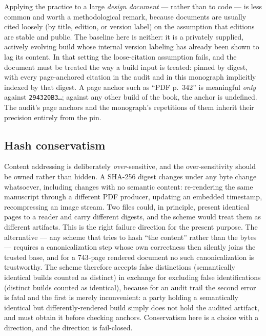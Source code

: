 Applying the practice to a large \emph{design document} --- rather than
to code --- is less common and worth a methodological remark, because
documents are usually cited loosely (by title, edition, or version
label) on the assumption that editions are stable and public. The
baseline here is neither: it is a privately supplied, actively evolving
build whose internal version labeling has already been shown to lag its
content. In that setting the loose-citation assumption fails, and the
document must be treated the way a build input is treated: pinned by
digest, with every page-anchored citation in the audit and in this
monograph implicitly indexed by that digest. A page anchor such as
``PDF p.~342'' is meaningful \emph{only} against
\texttt{294320B3\ldots}; against any other build of the book, the anchor
is undefined. The audit's page anchors and the monograph's repetitions
of them inherit their precision entirely from the pin.

\subsection{Hash conservatism}\label{ch03:methodology:conservatism}

Content addressing is deliberately \emph{over}-sensitive, and the
over-sensitivity should be owned rather than hidden. A SHA-256 digest
changes under any byte change whatsoever, including changes with no
semantic content: re-rendering the same manuscript through a different
PDF producer, updating an embedded timestamp, recompressing an image
stream. Two files could, in principle, present identical pages to a
reader and carry different digests, and the scheme would treat them as
different artifacts. This is the right failure direction for the present
purpose. The alternative --- any scheme that tries to hash ``the
content'' rather than the bytes --- requires a canonicalization step
whose own correctness then silently joins the trusted base, and for a
743-page rendered document no such canonicalization is trustworthy. The
scheme therefore accepts false distinctions (semantically identical
builds counted as distinct) in exchange for excluding false
identifications (distinct builds counted as identical), because for an
audit trail the second error is fatal and the first is merely
inconvenient: a party holding a semantically identical but
differently-rendered build simply does not hold the audited artifact,
and must obtain it before checking anchors. Conservatism here is a
choice with a direction, and the direction is fail-closed.

